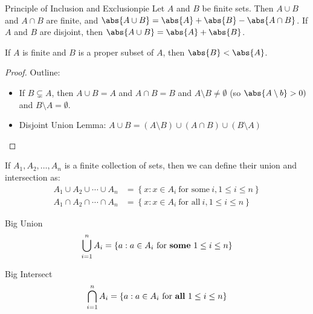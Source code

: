 \documentclass[letterpaper,12pt]{report}
\begin{document}
\begin{thmbox}{Principle of Inclusion and Exclusion}{pie}
    Let $A$ and $B$ be finite sets. Then $A \cup B$ and $A \cap B$ are finite, and $\abs{A \cup B} = \abs{A} + \abs{B} - \abs{A \cap B}$. If $A$ and $B$ are disjoint, then $\abs{A \cup B} = \abs{A} + \abs{B}$.
\end{thmbox}

\begin{exbox}{}{}
    If $A$ is finite and $B$ is a proper subset of $A$, then $\abs{B} < \abs{A}$.
    \tcblower
    \begin{proof}
        Outline:
        \begin{itemize}
            \item If $B \subsetneq A$, then $A \cup B = A$ and $A \cap B = B$ and $A \setminus B \neq \emptyset$ (so $\abs{A \setminus b} > 0)$ and $B \setminus A = \emptyset$.
            \item Disjoint Union Lemma: $A \cup B = (A \setminus B) \cup (A \cap B) \cup (B \setminus A)$
        \end{itemize}
    \end{proof}
\end{exbox}

If $A_1, A_2, \ldots, A_n$ is a finite collection of sets, then we can define their union and intersection as:
\begin{align*}
    A_1 \cup A_2 \cup \cdots \cup A_n &= \left\{ x : x \in A_i\ \text{for some}\ i, 1 \leq i \leq n \right\} \\
    A_1 \cap A_2 \cap \cdots \cap A_n &= \left\{ x : x \in A_i\ \text{for all}\ i, 1 \leq i \leq n \right\}
\end{align*}

\begin{dfnbox}{Big Union}{}
	\[ \bigcup\limits_{i=1}^{n} A_i = \{ a : a \in A_i\ \text{for \textbf{some}}\ 1 \leq i \leq n \} \]
\end{dfnbox}

\begin{dfnbox}{Big Intersect}{}
	\[ \bigcap\limits_{i=1}^{n} A_i = \{ a : a \in A_i\ \text{for \textbf{all}}\ 1 \leq i \leq n \} \]
\end{dfnbox}
\end{document}
